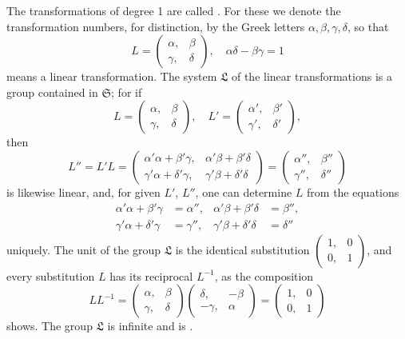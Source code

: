 The transformations of degree 1 are called . For these we denote the transformation numbers, for distinction, by the Greek letters $\alpha, \beta, \gamma, \delta$, so that
\[
L = \begin{pmatrix} \alpha, & \beta \\ \gamma, & \delta \end{pmatrix}, \quad \alpha\delta - \beta\gamma = 1
\]
means a linear transformation. The system $\mathfrak{L}$ of the linear transformations is a group contained in $\mathfrak{S}$; for if
\[
L = \begin{pmatrix} \alpha, & \beta \\ \gamma, & \delta \end{pmatrix}, \quad L' = \begin{pmatrix} \alpha', & \beta' \\ \gamma', & \delta' \end{pmatrix},
\]
then
\[
L'' = L'L = \begin{pmatrix} \alpha'\alpha+\beta'\gamma, & \alpha'\beta+\beta'\delta \\ \gamma'\alpha+\delta'\gamma, & \gamma'\beta+\delta'\delta \end{pmatrix} = \begin{pmatrix} \alpha'', & \beta'' \\ \gamma'', & \delta'' \end{pmatrix}
\]
is likewise linear, and, for given $L'$, $L''$, one can determine $L$ from the equations
\[
\begin{aligned}
\alpha'\alpha+\beta'\gamma &= \alpha'', & \alpha'\beta+\beta'\delta &= \beta'', \\
\gamma'\alpha+\delta'\gamma &= \gamma'', & \gamma'\beta+\delta'\delta &= \delta''
\end{aligned}
\]
uniquely. The unit of the group $\mathfrak{L}$ is the identical substitution $\begin{pmatrix} 1, & 0 \\ 0, & 1 \end{pmatrix}$, and every substitution $L$ has its reciprocal $L^{-1}$, as the composition
\[
LL^{-1} = \begin{pmatrix} \alpha, & \beta \\ \gamma, & \delta \end{pmatrix}\begin{pmatrix} \delta, & -\beta \\ -\gamma, & \alpha \end{pmatrix} = \begin{pmatrix} 1, & 0 \\ 0, & 1 \end{pmatrix}
\]
shows. The group $\mathfrak{L}$ is infinite and is .
